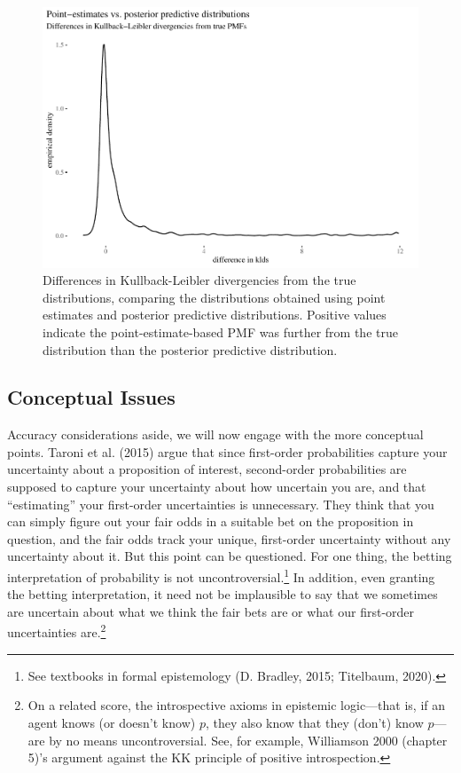 \documentclass[
  10pt,
  dvipsnames,enabledeprecatedfontcommands]{scrartcl}
\begin{document}
\begin{figure}[H]

\begin{center}\includegraphics[width=0.7\linewidth]{paper-outline_files/figure-latex/fig:kldsPlots-1} \end{center}
\caption{Differences in Kullback-Leibler divergencies from the true distributions, comparing the distributions obtained using point estimates and posterior predictive distributions. Positive values indicate the point-estimate-based PMF was further from the true distribution than the posterior predictive distribution.}
\label{fig:kldsPlots}
\end{figure}

\hypertarget{conceptual-issues}{%
\subsection{Conceptual Issues}\label{conceptual-issues}}

Accuracy considerations aside, we will now engage with the more
conceptual points. Taroni et al. (2015) argue that since first-order
probabilities capture your uncertainty about a proposition of interest,
second-order probabilities are supposed to capture your uncertainty
about how uncertain you are, and that ``estimating'' your first-order
uncertainties is unnecessary. They think that you can simply figure out
your fair odds in a suitable bet on the proposition in question, and the
fair odds track your unique, first-order uncertainty without any
uncertainty about it. But this point can be questioned. For one thing,
the betting interpretation of probability is not
uncontroversial.\footnote{See textbooks in formal epistemology (D.
  Bradley, 2015; Titelbaum, 2020).} In addition, even granting the
betting interpretation, it need not be implausible to say that we
sometimes are uncertain about what we think the fair bets are or what
our first-order uncertainties are.\footnote{On a related score, the
  introspective axioms in epistemic logic---that is, if an agent knows
  (or doesn't know) \(p\), they also know that they (don't) know
  \(p\)---are by no means uncontroversial. See, for example, Williamson
  2000 (chapter 5)'s argument against the KK principle of positive
  introspection.}
\end{document}
